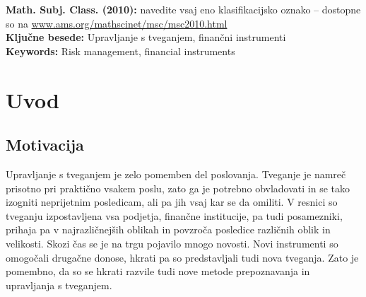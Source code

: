 \documentclass[12pt,a4paper]{amsart}
\theoremstyle{definition} %
\theoremstyle{plain} %
\begin{document}
\vfill\noindent
{\bf Math. Subj. Class. (2010):} navedite vsaj eno klasifikacijsko oznako -- 
        dostopne so na \url{www.ams.org/mathscinet/msc/msc2010.html}  \\[1mm]  
{\bf Ključne besede:} Upravljanje s tveganjem, finančni instrumenti  \\[1mm]  
{\bf Keywords:} Risk management, financial instruments
\pagebreak



\section{Uvod}
%


\subsection{Motivacija}
Upravljanje s tveganjem je zelo pomemben del poslovanja. Tveganje je namreč prisotno pri 
praktično vsakem poslu, zato ga je potrebno obvladovati in se tako izogniti neprijetnim
posledicam, ali pa jih vsaj kar se da omiliti. V resnici so tveganju izpostavljena vsa podjetja, 
finančne institucije, pa tudi posamezniki, prihaja pa v najrazličnejših oblikah in povzroča posledice
različnih oblik in velikosti. Skozi čas se je na trgu pojavilo mnogo novosti. Novi instrumenti so omogočali drugačne 
donose, hkrati pa so predstavljali tudi nova tveganja. Zato je pomembno, da so se hkrati razvile 
tudi nove metode prepoznavanja in upravljanja s tveganjem.
\end{document}
